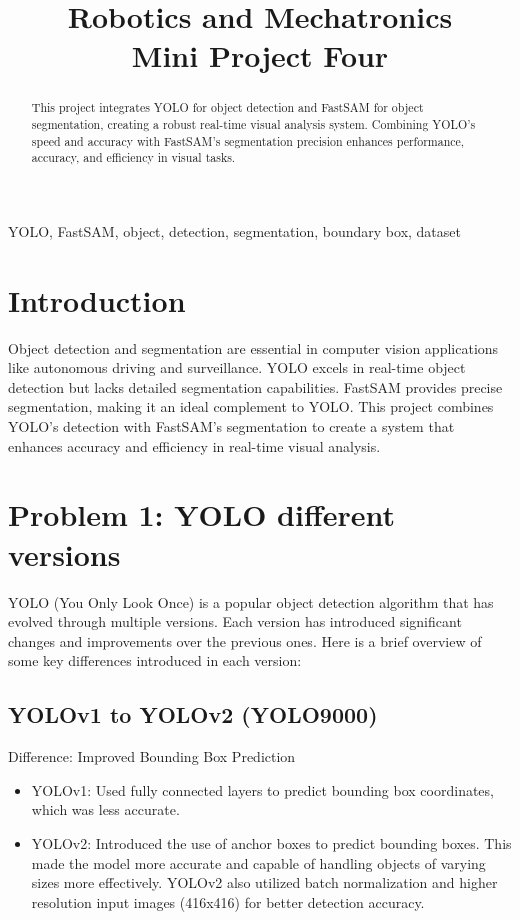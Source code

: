 \documentclass[conference]{IEEEtran}
\title{Robotics and Mechatronics\\
{\LARGE Mini Project Four}
}
\author{
    \IEEEauthorblockN{Abolfazl Nateghi}
    \IEEEauthorblockA{\small \textit{School of Mechanical Engineering} \\
    \footnotesize \textit{College of Engineering, University of Tehran \,}\\
    abolfazlnateghi@ut.ac.ir \\
    SID: 810699275}
    \and
    \IEEEauthorblockN{Hamed Moshtaghian}
    \IEEEauthorblockA{\small \textit{School of Mechanical Engineering} \\
    \footnotesize \textit{College of Engineering, University of Tehran \,}\\
    hamedmoshtaghian@ut.ac.ir \\
    SID: 810699265}
    \and
    \IEEEauthorblockN{Mohammad Montazeri}
    \IEEEauthorblockA{\small \textit{School of Mechanical Engineering} \\
    \footnotesize \textit{College of Engineering, University of Tehran \,}\\
    mohammadmontazeri@ut.ac.ir \\
    SID: 810699269}
}
\begin{document}
\maketitle

\begin{abstract}
  This project integrates YOLO for object detection and FastSAM for object segmentation, creating a robust real-time visual analysis system. Combining YOLO's speed and accuracy with FastSAM's segmentation precision enhances performance, accuracy, and efficiency in visual tasks.
\end{abstract}

\begin{IEEEkeywords}
  YOLO, FastSAM, object, detection, segmentation, boundary box, dataset
\end{IEEEkeywords}

\section{Introduction}
Object detection and segmentation are essential in computer vision applications like autonomous driving and surveillance. YOLO excels in real-time object detection but lacks detailed segmentation capabilities. FastSAM provides precise segmentation, making it an ideal complement to YOLO. This project combines YOLO's detection with FastSAM's segmentation to create a system that enhances accuracy and efficiency in real-time visual analysis.
\vspace{8px}

\section{Problem 1: YOLO different versions}
YOLO (You Only Look Once) is a popular object detection algorithm that has evolved through multiple versions. Each version has introduced significant changes and improvements over the previous ones. Here is a brief overview of some key differences introduced in each version:

\subsection*{YOLOv1 to YOLOv2 (YOLO9000)}
Difference: Improved Bounding Box Prediction
\begin{itemize}
  \item YOLOv1: Used fully connected layers to predict bounding box coordinates, which was less accurate.
  \item YOLOv2: Introduced the use of anchor boxes to predict bounding boxes. This made the model more accurate and capable of handling objects of varying sizes more effectively. YOLOv2 also utilized batch normalization and higher resolution input images (416x416) for better detection accuracy.
\end{itemize}
\end{document}
